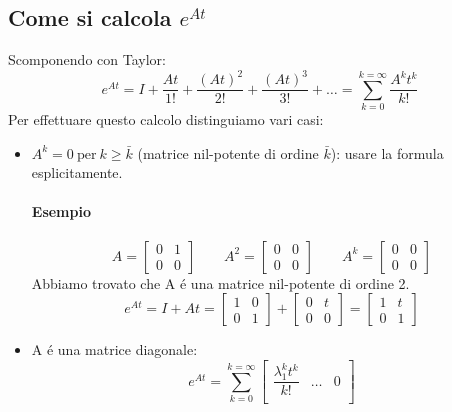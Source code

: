 \documentclass[../main.tex]{subfiles}
\begin{document}
	\subsection{Come si calcola $ e^{At} $}
	Scomponendo con Taylor:
		\[
			e^{At} = I + \dfrac{At}{1!} + \dfrac{(At)^2}{2!} + \dfrac{(At)^3}{3!} + \dots = \sum_{k=0}^{k=\infty} \dfrac{A^k t^k}{k!}
		\]
		Per effettuare questo calcolo distinguiamo vari casi:
		\begin{itemize}
			\item 
				$ A^k = 0\ \text{per}\ k \geq \bar k $ (matrice nil-potente di ordine $ \bar k $): usare la formula esplicitamente.
				
				\begin{mdframed}[style=Esempio]
					\paragraph{Esempio}
						\[
							A =
							\begin{bmatrix}
								0 & 1\\ 0 & 0
							\end{bmatrix}
							\qquad
							A^2 = 
							\begin{bmatrix}
								0 & 0\\ 0 & 0
							\end{bmatrix}
							\qquad
							A^k =
							\begin{bmatrix}
								0 & 0\\ 0 & 0
							\end{bmatrix}
						\]
						Abbiamo trovato che A \'e una matrice nil-potente di ordine 2.
						\[ 
							e^{At} = I + At = 
							\begin{bmatrix}
								1 & 0\\
								0 & 1
							\end{bmatrix} +
							\begin{bmatrix}
								0 & t\\
								0 & 0
							\end{bmatrix} = 
							\begin{bmatrix}
								1 & t\\
								0 & 1
							\end{bmatrix}
						\]
				\end{mdframed}
			\item
				A \'e una matrice diagonale:
				\[
					e^{At} = \sum_{k=0}^{k=\infty}
					\begin{bmatrix}
						\dfrac{\lambda_1^k t^k}{k!} & \dots & 0
						\\

\end{bmatrix}\]
\end{itemize}
\end{document}
